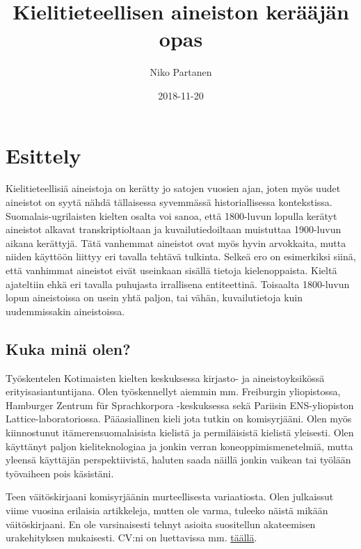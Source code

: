 \documentclass[]{book}
\title{Kielitieteellisen aineiston kerääjän opas}
\author{Niko Partanen}
\date{2018-11-20}
\begin{document}
\maketitle

{
\setcounter{tocdepth}{1}
\tableofcontents
}
\hypertarget{esittely}{%
\chapter{Esittely}\label{esittely}}

Kielitieteellisiä aineistoja on kerätty jo satojen vuosien ajan, joten
myös uudet aineistot on syytä nähdä tällaisessa syvemmässä
historiallisessa kontekstissa. Suomalais-ugrilaisten kielten osalta voi
sanoa, että 1800-luvun lopulla kerätyt aineistot alkavat
transkriptioltaan ja kuvailutiedoiltaan muistuttaa 1900-luvun aikana
kerättyjä. Tätä vanhemmat aineistot ovat myös hyvin arvokkaita, mutta
niiden käyttöön liittyy eri tavalla tehtävä tulkinta. Selkeä ero on
esimerkiksi siinä, että vanhimmat aineistot eivät useinkaan sisällä
tietoja kielenoppaista. Kieltä ajateltiin ehkä eri tavalla puhujasta
irrallisena entiteettinä. Toisaalta 1800-luvun lopun aineistoissa on
usein yhtä paljon, tai vähän, kuvailutietoja kuin uudemmissakin
aineistoissa.

\hypertarget{kuka-mina-olen}{%
\section{Kuka minä olen?}\label{kuka-mina-olen}}

Työskentelen Kotimaisten kielten keskuksessa kirjasto- ja
aineistoyksikössä erityisasiantuntijana. Olen työskennellyt aiemmin mm.
Freiburgin yliopistossa, Hamburger Zentrum für Sprachkorpora
-keskuksessa sekä Pariisin ENS-yliopiston Lattice-laboratoriossa.
Pääasiallinen kieli jota tutkin on komisyrjääni. Olen myös kiinnostunut
itämerensuomalaisista kielistä ja permiläisistä kielistä yleisesti. Olen
käyttänyt paljon kieliteknologiaa ja jonkin verran
koneoppimismenetelmiä, mutta yleensä käyttäjän perspektiivistä, haluten
saada näillä jonkin vaikean tai työlään työvaiheen pois käsistäni.

Teen väitöskirjaani komisyrjäänin murteellisesta variaatiosta. Olen
julkaissut viime vuosina erilaisia artikkeleja, mutten ole varma,
tuleeko näistä mikään väitöskirjaani. En ole varsinaisesti tehnyt
asioita suositellun akateemisen urakehityksen mukaisesti. CV:ni on
luettavissa mm.
\href{https://github.com/nikopartanen/cv/blob/master/niko_partanen_cv_fin.pdf}{täällä}.
\end{document}

